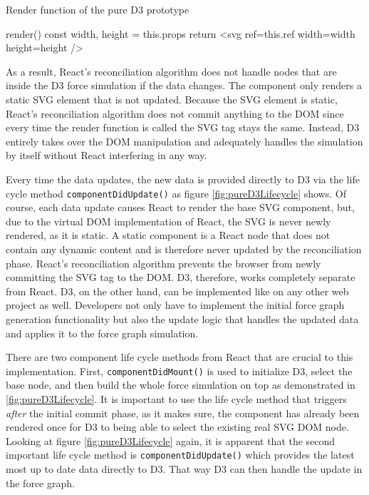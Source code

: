 \begin{program}
\caption{Render function of the pure D3 prototype}
\label{prog:pureD3render}
\begin{JsCode}
render() {
  const { width, height } = this.props
  return <svg ref={this.ref} width={width} height={height} />
}
\end{JsCode}
\end{program}

As a result, React's reconciliation algorithm does not handle nodes that are inside the D3 force simulation if the data changes. The component only renders a static SVG element that is not updated. Because the SVG element is static, React's reconciliation algorithm does not commit anything to the DOM since every time the render function is called the SVG tag stays the same. Instead, D3 entirely takes over the DOM manipulation and adequately handles the simulation by itself without React interfering in any way.

Every time the data updates, the new data is provided directly to D3 via the life cycle method \texttt{componentDidUpdate()} as figure \ref{fig:pureD3Lifecycle} shows. Of course, each data update causes React to render the base SVG component, but, due to the virtual DOM implementation of React, the SVG is never newly rendered, as it is static. A static component is a React node that does not contain any dynamic content and is therefore never updated by the reconciliation phase. React's reconciliation algorithm prevents the browser from newly committing the SVG tag to the DOM. D3, therefore, works completely separate from React. D3, on the other hand, can be implemented like on any other web project as well. Developers not only have to implement the initial force graph generation functionality but also the update logic that handles the updated data and applies it to the force graph simulation.

There are two component life cycle methods from React that are crucial to this implementation. First, \texttt{componentDidMount()} is used to initialize D3, select the base node, and then build the whole force simulation on top as demonstrated in \ref{fig:pureD3Lifecycle}. It is important to use the life cycle method that triggers \emph{after} the initial commit phase, as it makes sure, the component has already been rendered once for D3 to being able to select the existing real SVG DOM node. Looking at figure \ref{fig:pureD3Lifecycle} again, it is apparent that the second important life cycle method is \texttt{componentDidUpdate()} which provides the latest most up to date data directly to D3. That way D3 can then handle the update in the force graph.

